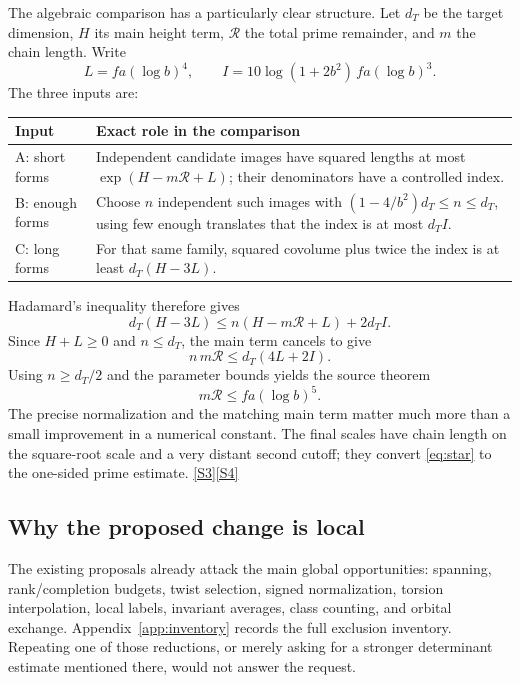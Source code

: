 \documentclass[11pt,letterpaper]{article}
\theoremstyle{remark}
\newcommand{\src}[1]{\hyperref[src:#1]{[S#1]}}
\begin{document}
The algebraic comparison has a particularly clear structure. Let \(d_T\) be the
target dimension, \(H\) its main height term, \(\mathcal R\) the total prime
remainder, and \(m\) the chain length. Write
\[
 L=fa(\log b)^4,\qquad I=10\log(1+2b^2)\,fa(\log b)^3.
\]
The three inputs are:
\begin{center}
\begin{tabularx}{\linewidth}{@{}l X@{}}
\toprule
Input & Exact role in the comparison\\
\midrule
A: short forms & Independent candidate images have squared lengths at most
\(\exp(H-m\mathcal R+L)\); their denominators have a controlled index.\\
B: enough forms & Choose \(n\) independent such images with
\((1-4/b^2)d_T\le n\le d_T\), using few enough translates that the index is at most \(d_TI\).\\
C: long forms & For that same family, squared covolume plus twice the index is at least \(d_T(H-3L)\).\\
\bottomrule
\end{tabularx}
\end{center}
Hadamard's inequality therefore gives
\[
 d_T(H-3L)\le n(H-m\mathcal R+L)+2d_TI.
\]
Since \(H+L\ge0\) and \(n\le d_T\), the main term cancels to give
\[
 n\,m\mathcal R\le d_T(4L+2I).
\]
Using \(n\ge d_T/2\) and the parameter bounds yields the source theorem
\begin{equation}
 m\mathcal R\le fa(\log b)^5. \label{eq:star}
\end{equation}
The precise normalization and the matching main term matter much more than a
small improvement in a numerical constant. The final scales have chain length
on the square-root scale and a very distant second cutoff; they convert
\eqref{eq:star} to the one-sided prime estimate. \src{3}\src{4}

\subsection{Why the proposed change is local}

The existing proposals already attack the main global opportunities: spanning,
rank/completion budgets, twist selection, signed normalization, torsion
interpolation, local labels, invariant averages, class counting, and orbital
exchange. Appendix~\ref{app:inventory} records the full exclusion inventory.
Repeating one of those reductions, or merely asking for a stronger determinant
estimate mentioned there, would not answer the request.
\end{document}
